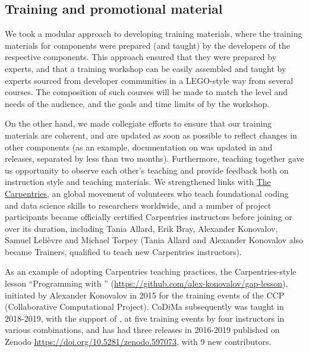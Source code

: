 \documentclass{deliverablereport}
\begin{document}
\subsection{Training and promotional material}

We took a modular approach to developing training materials,
where the training materials for \ODK components were prepared
(and taught) by the developers of the respective components.
This approach ensured that they were prepared by experts, and
that a training workshop can be easily assembled and taught by
experts sourced from developer communities in a LEGO-style way from several courses.
The composition of such courses will be made to
match the level and needs of the audience, and the goals and
time limits of by the workshop.

On the other hand, we made collegiate efforts to ensure that
our training materials are coherent, and are updated as soon as possible
to reflect changes in other \ODK components (as an example,
documentation on  was updated in \GAP and
\SageMath releases, separated by less than two months). Furthermore,
teaching together gave us opportunity to observe each other's
teaching and provide feedback both on instruction style and teaching
materials. We strengthened links with
\href{https://carpentries.org/}{The Carpentries}, an global movement
of volunteers who teach foundational coding and data science skills
to researchers worldwide, and a number of project participants became
officially certified Carpentries instructors before joining \ODK or
over its duration, including Tania Allard, Erik Bray, Alexander Konovalov,
Samuel Leli\`evre and Michael Torpey (Tania Allard and Alexander Konovalov
also became Trainers, qualified to teach new Carpentries instructors).

As an example of adopting Carpentries teaching practices,
the Carpentries-style lesson ``Programming with \GAP''
(\url{https://github.com/alex-konovalov/gap-lesson}),
initiated by Alexander Konovalov in 2015 for the training events
of the CCP (Collaborative Computational Project). CoDiMa subsequently
was taught in 2018-2019, with the support of
\ODK, at five training events by four instructors in various
combinations,
and has had three releases in 2016-2019 published on Zenodo
\url{https://doi.org/10.5281/zenodo.597073},
with 9 new contributors. %
\end{document}
